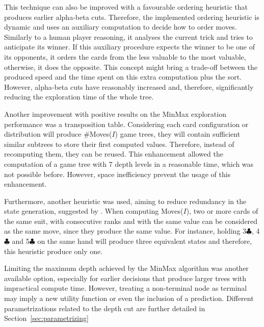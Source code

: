 This technique can also be improved with a favourable ordering heuristic that produces earlier alpha-beta cuts.
Therefore, the implemented ordering heuristic is dynamic and uses an auxiliary computation to decide how to order moves.
Similarly to a human player reasoning, it analyses the current trick and tries to anticipate its winner.
If this auxiliary procedure expects the winner to be one of its opponents, it orders the cards from the less valuable to the most valuable, otherwise, it does the opposite.
This concept might bring a trade-off between the produced speed and the time spent on this extra computation plus the sort.
However, alpha-beta cuts have reasonably increased and, therefore, significantly reducing the exploration time of the whole tree.


Another improvement with positive results on the MinMax exploration performance was a transposition table.
Considering each card configuration or distribution will produce \#Moves($I$) game trees, they will contain sufficient similar subtrees to store their first computed values.
Therefore, instead of recomputing them, they can be reused.
This enhancement allowed the computation of a game tree with 7 depth levels in a reasonable time, which was not possible before.
However, space inefficiency prevent the usage of this enhancement.


Furthermore, another heuristic was used, aiming to reduce redundancy in the state generation, suggested by \citet{Buro}.
When computing Moves($I$), two or more cards of the same suit, with consecutive ranks and with the same value can be considered as the same move, since they produce the same value.
For instance, holding 3$\clubsuit$, 4$\clubsuit$ and 5$\clubsuit$ on the same hand will produce three equivalent states and therefore, this heuristic produce only one.

Limiting the maximum depth achieved by the MinMax algorithm was another available option, especially for earlier decisions that produce larger trees with impractical compute time.
However, treating a non-terminal node as terminal may imply a new utility function or even the inclusion of a prediction.
Different parametrizations related to the depth cut are further detailed in Section~\ref{sec:parametrizing}












